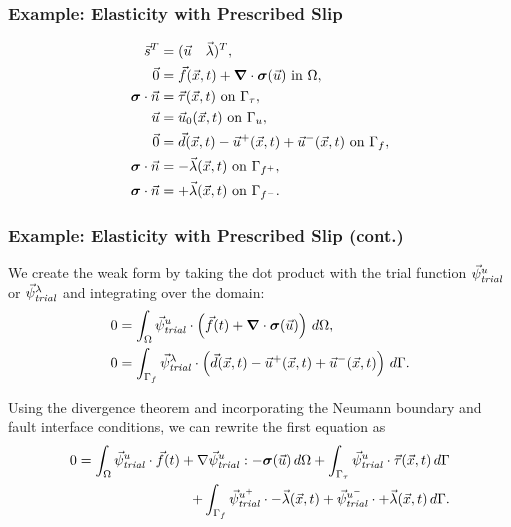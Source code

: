 \documentclass[aspectratio=169]{beamer}
\begin{document}
\begin{frame}
  \frametitle{Example: Elasticity with Prescribed Slip}

  
\begin{align}
  \vec{s}^T &= (\vec{u} \quad \vec{\lambda})^T, \\
%
  \vec{0} &= \vec{f}(\vec{x},t) + \tensor{\nabla} \cdot \tensor{\sigma}(\vec{u}) \text{ in }
\Omega, \\
  \tensor{\sigma} \cdot \vec{n} &= \vec{\tau}(\vec{x},t) \text{ on }\Gamma_\tau, \\
  \vec{u} &= \vec{u}_0(\vec{x},t) \text{ on }\Gamma_u, \\
  \vec{0} &= \vec{d}(\vec{x},t) - \vec{u}^+(\vec{x},t) + \vec{u}^-(\vec{x},t) \text{ on }\Gamma_f, \\
  \tensor{\sigma} \cdot \vec{n} &= -\vec{\lambda}(\vec{x},t) \text{ on }\Gamma_{f^+}, \\
  \tensor{\sigma} \cdot \vec{n} &= +\vec{\lambda}(\vec{x},t) \text{ on }\Gamma_{f^-}.
\end{align}

\end{frame}


\begin{frame}
  \frametitle{Example: Elasticity with Prescribed Slip (cont.)}
  \summary{}

We create the weak form by taking the dot product with the trial
function $\trialvec[u]$ or $\trialvec[\lambda]$ and integrating over the domain:
\begin{align}
  0 &= \int_\Omega \trialvec[u] \cdot \left( \vec{f}(t) + \tensor{\nabla} \cdot \tensor{\sigma} (\vec{u}) \right) \, d\Omega, \\
  0 &= \int_{\Gamma_f} \trialvec[\lambda] \cdot \left( \vec{d}(\vec{x},t) - \vec{u}^+(\vec{x},t) + \vec{u}^-(\vec{x},t) \right) \, d\Gamma.
\end{align}

Using the divergence theorem and incorporating the Neumann boundary and fault interface
conditions, we can rewrite the first equation as
\begin{equation}
  \begin{split}
  0 = \int_\Omega \trialvec[u] \cdot \vec{f}(t) + \nabla
  \trialvec[u] : -\tensor{\sigma}
  (\vec{u}) \, d\Omega
  + \int_{\Gamma_\tau} \trialvec[u] \cdot \vec{\tau}(\vec{x},t) \,
  d\Gamma \\
  + \int_{\Gamma_{f}} \trialvec[u^+] \cdot -\vec{\lambda}(\vec{x},t) +
  \trialvec[u^-] \cdot +\vec{\lambda}(\vec{x},t)\, d\Gamma.
  \end{split}
\end{equation}

\end{frame}
\end{document}
